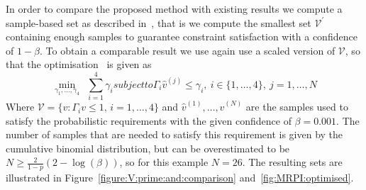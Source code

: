 \documentclass{ifacconf}
\providecommand{\V}{\mathcal V}
\providecommand{\bfa}[1]{\mathbf{#1}}
\begin{document}
In order to compare the proposed method with existing results we compute a sample-based set as described in~\cite{Zhang2015}, that is we compute the smallest set $\V^\prime$ containing enough samples to guarantee constraint satisfaction with a confidence of $1-\beta$.
%
To obtain a comparable result we use again use a scaled version of $\V$, so that the optimisation~\citep[eq.~(10)]{Zhang2015} is given as
%
\begin{subequations}\label{eq:comparison:set}
\begin{equation}\min_{\gamma_1,\dots,\gamma_4} \  \ \sum_{i=1}^4\gamma_i
\end{equation}
subject to 
\begin{equation}
\Gamma_i \hat{v}^{(j)}\leq \gamma_i ,\ i\in\{1,\ldots,4\}, \ j = 1,\ldots,N
\end{equation}
\end{subequations}
%
Where $\V = \{v : \Gamma_i v \leq 1, \, i =1, \ldots ,4\}$ and
$\hat{v}^{(1)},\ldots,\hat{v}^{(N)}$
are the samples used to satisfy the probabilistic requirements with the given confidence of $\beta=0.001$. 
%
The number of samples that are needed to satisfy this requirement is given by the cumulative binomial distribution, but can be overestimated to be $N \geq \frac{2}{1-p}(2-\log(\beta))$, so for this example $N = 26$.
%
The resulting sets are illustrated in Figure~\ref{figure:V:prime:and:comparison} and~\ref{fig:MRPI:optimised}.
%
\end{document}
